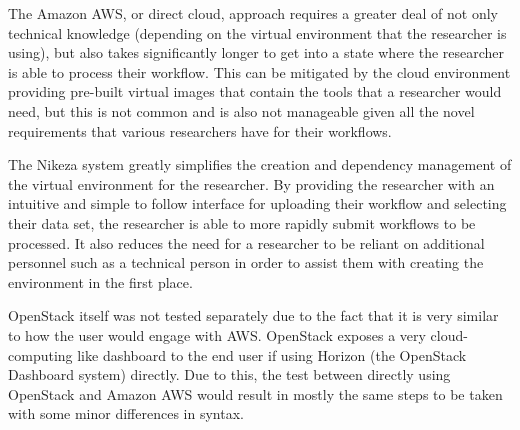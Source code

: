 The Amazon AWS, or direct cloud, approach requires a greater deal of not only technical knowledge (depending on the virtual environment that the researcher is using), but also takes significantly longer to get into a state where the researcher is able to process their workflow. This can be mitigated by the cloud environment providing pre-built virtual images that contain the tools that a researcher would need, but this is not common and is also not manageable given all the novel requirements that various researchers have for their workflows.

The Nikeza system greatly simplifies the creation and dependency management of the virtual environment for the researcher. By providing the researcher with an intuitive and simple to follow interface for uploading their workflow and selecting their data set, the researcher is able to more rapidly submit workflows to be processed. It also reduces the need for a researcher to be reliant on additional personnel such as a technical person in order to assist them with creating the environment in the first place.

OpenStack itself was not tested separately due to the fact that it is very similar to how the user would engage with AWS. OpenStack exposes a very cloud-computing like dashboard to the end user if using Horizon (the OpenStack Dashboard system) directly. Due to this, the test between directly using OpenStack and Amazon AWS would result in mostly the same steps to be taken with some minor differences in syntax.
